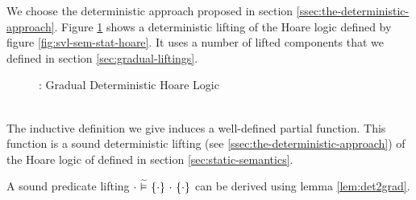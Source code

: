 We choose the deterministic approach proposed in section \ref{ssec:the-deterministic-approach}.
Figure \ref{fig:gvl-sem-stat-hoare} shows a deterministic lifting of the Hoare logic defined by figure \ref{fig:svl-sem-stat-hoare}.
It uses a number of lifted components that we defined in section \ref{sec:gradual-liftings}.
\begin{figure}[h!]
    
    \caption{\gvl: Gradual Deterministic Hoare Logic} 
    \label{fig:gvl-sem-stat-hoare}
\end{figure}

\begin{lemma}\label{lemma:gvlidf-sdl-hl}~\\
    The inductive definition we give induces a well-defined partial function.
    This function is a sound deterministic lifting (see \ref{ssec:the-deterministic-approach}) of the Hoare logic of \svlidf defined in section \ref{sec:static-semantics}.
\end{lemma}
A sound predicate lifting ${\cdot} \,\,\widetilde{\vDash}\,\, \{{\cdot}\} ~{\cdot}~ \{{\cdot}\}$ can be derived using lemma \ref{lem:det2grad}.
